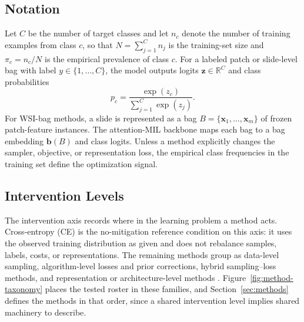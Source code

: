 \documentclass[11pt]{article}
\begin{document}
\subsection{Notation}
Let $C$ be the number of target classes and let $n_c$ denote the number of training examples from class $c$, so that $N=\sum_{j=1}^{C}n_j$ is the training-set size and $\pi_c=n_c/N$ is the empirical prevalence of class $c$. For a labeled patch or slide-level bag with label $y\in\{1,\ldots,C\}$, the model outputs logits $\mathbf{z}\in\mathbb{R}^{C}$ and class probabilities
\begin{equation}
  p_c = \frac{\exp(z_c)}{\sum_{j=1}^{C}\exp(z_j)}.
  \label{eq:softmax}
\end{equation}
For WSI-bag methods, a slide is represented as a bag $B=\{\mathbf{x}_1,\ldots,\mathbf{x}_m\}$ of frozen patch-feature instances. The attention-MIL backbone maps each bag to a bag embedding $\mathbf{b}(B)$ and class logits. Unless a method explicitly changes the sampler, objective, or representation loss, the empirical class frequencies in the training set define the optimization signal.

\subsection{Intervention Levels}
\label{sec:intervention-axis}
The intervention axis records where in the learning problem a method acts. Cross-entropy (CE) is the no-mitigation reference condition on this axis: it uses the observed training distribution as given and does not rebalance samples, labels, costs, or representations. The remaining methods group as data-level sampling, algorithm-level losses and prior corrections, hybrid sampling--loss methods, and representation or architecture-level methods \citep{saini2023tacklingClass,zhang2023deepLong}. Figure~\ref{fig:method-taxonomy} places the tested roster in these families, and Section~\ref{sec:methods} defines the methods in that order, since a shared intervention level implies shared machinery to describe.
\end{document}
